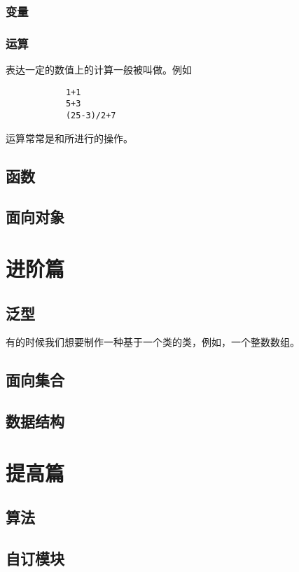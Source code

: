 \documentclass[a4paper]{tufte-book}
\begin{document}
		\section{变量}
			
		\section{运算}
			表达一定的数值上的计算一般被叫做。例如
			\begin{verbatim}
			1+1
			5+3
			(25-3)/2+7
			\end{verbatim}
			运算常常是和所进行的操作。
			
	\chapter{函数}
	\chapter{面向对象}
	
\part{进阶篇}
	\chapter{泛型}
		有的时候我们想要制作一种基于一个类的类，例如，一个整数数组。
		
	\chapter{面向集合}
	\chapter{数据结构}
	
\part{提高篇}
	\chapter{算法}
	\chapter{自订模块}
	
\renewcommand{\thepart}{}
\end{document}

